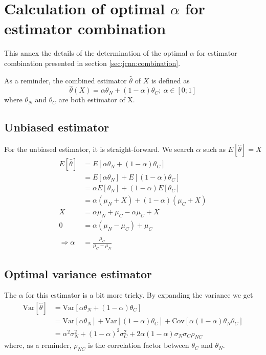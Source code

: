 \documentclass[../main.tex]{subfiles}
\begin{document}
\chapter{Calculation of optimal $\alpha$ for estimator combination}
\label{sec:annex:jcnn:alpha}

This annex the details of the determination of the optimal $\alpha$ for estimator combination presented in section \ref{sec:jcnn:combination}.

As a reminder, the combined estimator $\hat{\theta}$ of $X$ is defined as
\begin{equation}
  \hat{\theta}(X) = \alpha \theta_N + (1 - \alpha) \theta_C; ~ \alpha \in [0; 1]
\end{equation}
where $\theta_N$ and $\theta_C$ are both estimator of X.

\section{Unbiased estimator}
\label{sec:annex:jcnn:unbiased}
For the unbiased estimator, it is straight-forward. We search $\alpha$ such as $E[\hat{\theta}] = X$
\begin{align}
  E[\hat{\theta}] &= E[\alpha \theta_N + (1-\alpha) \theta_C] \\
                  &= E[\alpha \theta_N] + E[(1-\alpha) \theta_C] \\
                  &= \alpha E[\theta_N] + (1-\alpha) E[\theta_C] \\
                  &= \alpha (\mu_N + X) + (1-\alpha) (\mu_C + X) \\
                X &= \alpha \mu_N + \mu_C - \alpha \mu_C + X \\
                0 &= \alpha (\mu_N - \mu_C) + \mu_C \\
                \\
                \Rightarrow \alpha &= \frac{\mu_C}{\mu_C - \mu_N}
\end{align}

\section{Optimal variance estimator}
\label{sec:annex:jcnn:variance}

The $\alpha$ for this estimator is a bit more tricky. By expanding the variance we get
\begin{align}
  \mathrm{Var}[\hat{\theta}] &= \mathrm{Var}[\alpha \theta_N + (1-\alpha) \theta_C] \\
                             &= \mathrm{Var}[\alpha \theta_N] + \mathrm{Var}[(1-\alpha) \theta_C] + \mathrm{Cov}[\alpha(1-\alpha) \theta_N \theta_C] \\
                             &= \alpha^2 \sigma_N^2 + (1 - \alpha)^2 \sigma_C^2 + 2\alpha(1-\alpha) \sigma_N \sigma_C \rho_{NC}
\end{align}
where, as a reminder, $\rho_{NC}$ is the correlation factor between $\theta_C$ and $\theta_N$.
\end{document}
